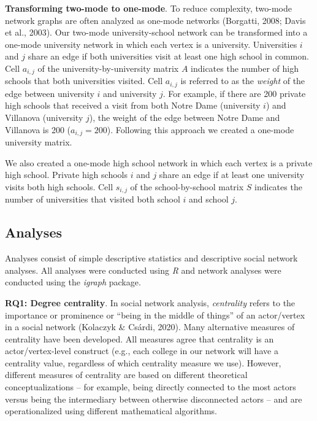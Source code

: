 \documentclass[
  12pt,
]{article}
\begin{document}
\textbf{Transforming two-mode to one-mode}. To reduce complexity, two-mode network graphs are often analyzed as one-mode networks (Borgatti, 2008; Davis et al., 2003). Our two-mode university-school network can be transformed into a one-mode university network in which each vertex is a university. Universities \(i\) and \(j\) share an edge if both universities visit at least one high school in common. Cell \(a_{i,j}\) of the university-by-university matrix \(A\) indicates the number of high schools that both universities visited. Cell \(a_{i,j}\) is referred to as the \emph{weight} of the edge between university \(i\) and university \(j\). For example, if there are 200 private high schools that received a visit from both Notre Dame (university \(i\)) and Villanova (university \(j\)), the weight of the edge between Notre Dame and Villanova is 200 (\(a_{i,j}=200\)). Following this approach we created a one-mode university matrix.

We also created a one-mode high school network in which each vertex is a private high school. Private high schools \(i\) and \(j\) share an edge if at least one university visits both high schools. Cell \(s_{i,j}\) of the school-by-school matrix \(S\) indicates the number of universities that visited both school \(i\) and school \(j\).

\hypertarget{analyses}{%
\subsection{Analyses}\label{analyses}}

Analyses consist of simple descriptive statistics and descriptive social network analyses. All analyses were conducted using \emph{R} and network analyses were conducted using the \emph{igraph} package.

\textbf{RQ1: Degree centrality}. In social network analysis, \emph{centrality} refers to the importance or prominence or ``being in the middle of things'' of an actor/vertex in a social network (Kolaczyk \& Csárdi, 2020). Many alternative measures of centrality have been developed. All measures agree that centrality is an actor/vertex-level construct (e.g., each college in our network will have a centrality value, regardless of which centrality measure we use). However, different measures of centrality are based on different theoretical conceptualizations -- for example, being directly connected to the most actors versus being the intermediary between otherwise disconnected actors -- and are operationalized using different mathematical algorithms.
\end{document}
